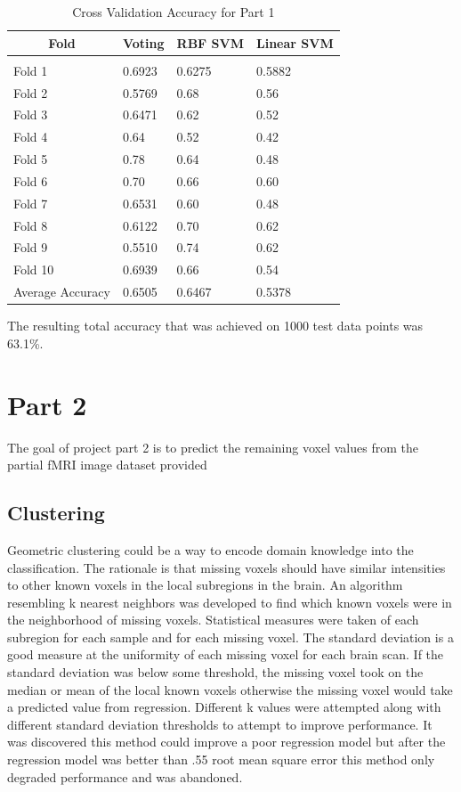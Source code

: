 \documentclass{article} %
\begin{document}
\begin{table}[h]
\caption{Cross Validation Accuracy for Part 1}
\label{classtable}
\begin{center}
	\begin{tabular}{llll}
		\multicolumn{1}{c}{\bf Fold}  &\multicolumn{1}{c}{\bf Voting} &\multicolumn{1}{c}{\bf RBF SVM} &\multicolumn{1}{c}{\bf Linear SVM}
		\\ \hline \\
		Fold 1   &0.6923 &0.6275 &0.5882\\
		Fold 2   &0.5769 &0.68 &0.56\\
		Fold 3   &0.6471 &0.62 &0.52\\
		Fold 4   &0.64   &0.52 &0.42\\
		Fold 5   &0.78   &0.64 &0.48\\
		Fold 6   &0.70   &0.66 &0.60\\
		Fold 7   &0.6531 &0.60 &0.48\\
		Fold 8   &0.6122 &0.70 &0.62\\
		Fold 9   &0.5510 &0.74 &0.62\\
		Fold 10   &0.6939 &0.66 &0.54\\
		Average Accuracy   &0.6505 &0.6467 &0.5378\\
	\end{tabular}
\end{center}
\end{table} 

The resulting total accuracy that was achieved on 1000 test data points was 63.1\%.

\section{Part 2}
The goal of project part 2 is to predict the remaining voxel values from the partial fMRI image dataset provided 

\subsection{Clustering}
Geometric clustering could be a way to encode domain knowledge into the classification. The rationale is that missing voxels should have similar intensities to other known voxels in the local subregions in the brain. An algorithm resembling k nearest neighbors was developed to find which known voxels were in the neighborhood of missing voxels. Statistical measures were taken of each subregion for each sample and for each missing voxel.  The standard deviation is a good measure at the uniformity of each missing voxel for each brain scan. If the standard deviation was below some threshold, the missing voxel took on the median or mean of the local known voxels otherwise the missing voxel would take a predicted value from regression. Different k values were attempted along with different standard deviation thresholds to attempt to improve performance. It was discovered this method could improve a poor regression model but after the regression model was better than .55 root mean square error this method only degraded performance and was abandoned. 
\end{document}
